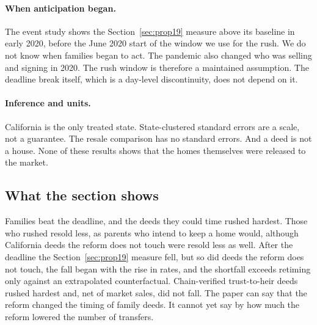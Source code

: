 \paragraph{When anticipation began.} The event study shows the Section~\ref{sec:prop19} measure above its baseline in early 2020, before the June 2020 start of the window we use for the rush. We do not know when families began to act. The pandemic also changed who was selling and signing in 2020. The rush window is therefore a maintained assumption. The deadline break itself, which is a day-level discontinuity, does not depend on it.

\paragraph{Inference and units.} California is the only treated state. State-clustered standard errors are a scale, not a guarantee. The resale comparison has no standard errors. And a deed is not a house. None of these results shows that the homes themselves were released to the market.

\subsection{What the section shows}

Families beat the deadline, and the deeds they could time rushed hardest. Those who rushed resold less, as parents who intend to keep a home would, although California deeds the reform does not touch were resold less as well. After the deadline the Section~\ref{sec:prop19} measure fell, but so did deeds the reform does not touch, the fall began with the rise in rates, and the shortfall exceeds retiming only against an extrapolated counterfactual. Chain-verified trust-to-heir deeds rushed hardest and, net of market sales, did not fall. The paper can say that the reform changed the timing of family deeds. It cannot yet say by how much the reform lowered the number of transfers.
